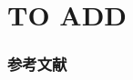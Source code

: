 



\section{TO ADD}


\begin{frame}


\end{frame}



\begin{frame}
\frametitle{参考文献}



\end{frame}








